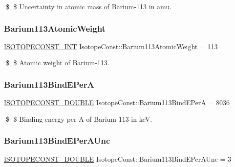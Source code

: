 \$ \$ Uncertainty in atomic mass of Barium-\/113 in amu. \mbox{\label{group___isotope_const-_barium-_ba113_ga8c2eb20042c14c5c7d35da9ce5b54912}} 
\subsubsection{\texorpdfstring{Barium113\+Atomic\+Weight}{Barium113AtomicWeight}}
{\footnotesize\ttfamily \mbox{\hyperlink{group___isotope_const-_macros_ga5f18360b3e99483a35c32d789e62621c}{I\+S\+O\+T\+O\+P\+E\+C\+O\+N\+S\+T\+\_\+\+I\+NT}} Isotope\+Const\+::\+Barium113\+Atomic\+Weight = 113}

\$ \$ Atomic weight of Barium-\/113. \mbox{\label{group___isotope_const-_barium-_ba113_ga4aaedc4a54c2b882eeebd2156dca6779}} 
\subsubsection{\texorpdfstring{Barium113\+Bind\+E\+PerA}{Barium113BindEPerA}}
{\footnotesize\ttfamily \mbox{\hyperlink{group___isotope_const-_macros_ga8f45a7272ce02c0b4c65c44636ed719a}{I\+S\+O\+T\+O\+P\+E\+C\+O\+N\+S\+T\+\_\+\+D\+O\+U\+B\+LE}} Isotope\+Const\+::\+Barium113\+Bind\+E\+PerA = 8036}

\$ \$ Binding energy per A of Barium-\/113 in keV. \mbox{\label{group___isotope_const-_barium-_ba113_gae0c81149d13aa335aca07009e77434dc}} 
\subsubsection{\texorpdfstring{Barium113\+Bind\+E\+Per\+A\+Unc}{Barium113BindEPerAUnc}}
{\footnotesize\ttfamily \mbox{\hyperlink{group___isotope_const-_macros_ga8f45a7272ce02c0b4c65c44636ed719a}{I\+S\+O\+T\+O\+P\+E\+C\+O\+N\+S\+T\+\_\+\+D\+O\+U\+B\+LE}} Isotope\+Const\+::\+Barium113\+Bind\+E\+Per\+A\+Unc = 3}

